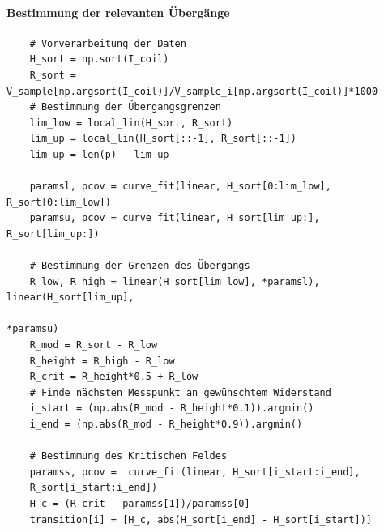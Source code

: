 \documentclass[german,  %
parskip=full,  %
headsepline]{scrartcl}
\begin{document}
\paragraph{Bestimmung der relevanten Übergänge}
\begin{verbatim}
    # Vorverarbeitung der Daten
    H_sort = np.sort(I_coil)
    R_sort = V_sample[np.argsort(I_coil)]/V_sample_i[np.argsort(I_coil)]*1000
    # Bestimmung der Übergangsgrenzen
    lim_low = local_lin(H_sort, R_sort)
    lim_up = local_lin(H_sort[::-1], R_sort[::-1])
    lim_up = len(p) - lim_up
    
    paramsl, pcov = curve_fit(linear, H_sort[0:lim_low], R_sort[0:lim_low])
    paramsu, pcov = curve_fit(linear, H_sort[lim_up:], R_sort[lim_up:])
    
    # Bestimmung der Grenzen des Übergangs
    R_low, R_high = linear(H_sort[lim_low], *paramsl), linear(H_sort[lim_up], 
                                                              *paramsu)
    R_mod = R_sort - R_low
    R_height = R_high - R_low
    R_crit = R_height*0.5 + R_low
    # Finde nächsten Messpunkt an gewünschtem Widerstand
    i_start = (np.abs(R_mod - R_height*0.1)).argmin()
    i_end = (np.abs(R_mod - R_height*0.9)).argmin()
    
    # Bestimmung des Kritischen Feldes
    paramss, pcov =  curve_fit(linear, H_sort[i_start:i_end], 
    R_sort[i_start:i_end])
    H_c = (R_crit - paramss[1])/paramss[0]
    transition[i] = [H_c, abs(H_sort[i_end] - H_sort[i_start])]
\end{verbatim}
\end{document}
